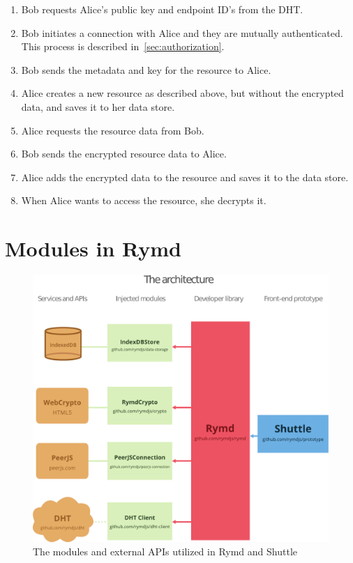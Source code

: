\begin{enumerate}
  \item Bob requests Alice's public key and endpoint ID's from the DHT.
  \item Bob initiates a connection with Alice and they are mutually authenticated. This process is described in~\ref{sec:authorization}.
  \item Bob sends the metadata and key for the resource to Alice.
  \item Alice creates a new resource as described above, but without the encrypted data, and saves it to her data store.
  \item Alice requests the resource data from Bob.
  \item Bob sends the encrypted resource data to Alice.
  \item Alice adds the encrypted data to the resource and saves it to the data store.
  \item When Alice wants to access the resource, she decrypts it.
\end{enumerate}


\section{Modules in Rymd}


\begin{figure}[h]
\centering
\includegraphics[width=\textwidth,height=0.4\paperheight,keepaspectratio
]{figures/architecture}
\caption{The modules and external APIs utilized in Rymd and Shuttle}
\label{fig:architecture}
\end{figure}
